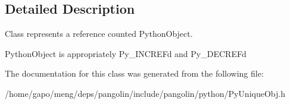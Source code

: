 \subsection{Detailed Description}
Class represents a reference counted Python\+Object. 

Python\+Object is appropriately Py\+\_\+\+I\+N\+C\+R\+EF\textquotesingle{}d and Py\+\_\+\+D\+E\+C\+R\+EF\textquotesingle{}d 

The documentation for this class was generated from the following file\+:\begin{DoxyCompactItemize}
\item 
/home/gapo/meng/deps/pangolin/include/pangolin/python/Py\+Unique\+Obj.\+h\end{DoxyCompactItemize}
